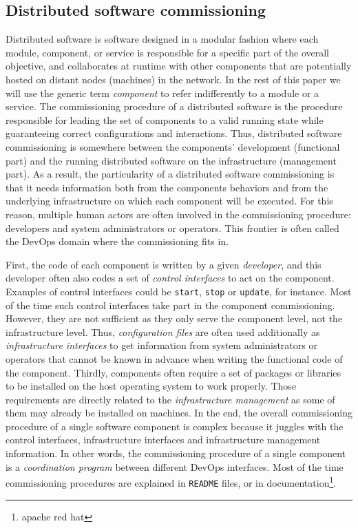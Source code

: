 
\subsection{Distributed software commissioning}

Distributed software is software designed in a modular fashion
where each module, component, or service is responsible for a
specific part of the overall objective, and collaborates at runtime
with other components that are potentially hosted on distant nodes
(\ie machines) in the network. In the rest of this paper we will
use the generic term \emph{component} to refer
indifferently to a module or a service.
%
The commissioning procedure of a distributed software is the procedure
responsible for leading the set of components to a valid running state
while guaranteeing correct configurations and
interactions. Thus, distributed software commissioning is somewhere
between the components' development (functional part) and the running
distributed software on the infrastructure (management part). As a
result, the particularity of a distributed software commissioning is
that it needs information both from the components behaviors and from the
underlying infrastructure on which each component will be executed.
For this reason, multiple human actors are often involved in the
commissioning procedure: developers and system administrators or
operators. This frontier is often called the DevOps domain where the
commissioning fits in.

First, the code of each component is written by a given
\emph{developer}, and this developer often also codes a set of
\emph{control interfaces} to act on the component. Examples of control
interfaces could be \texttt{start}, \texttt{stop} or \texttt{update},
for instance. Most of the time such control interfaces take part in
the component commissioning. However, they are not sufficient as they
only serve the component level, not the infrastructure level. Thus,
\emph{configuration files} are often used additionally as
\emph{infrastructure interfaces} to get information from system
administrators or operators that cannot be known in advance when
writing the functional code of the component. Thirdly, components often
require a set of packages or libraries to be installed on the host
operating system to work properly. Those requirements are directly
related to the \emph{infrastructure management} as some of them may
already be installed on machines. In the end, the overall
commissioning procedure of a single software component is complex because
it juggles with the control interfaces, infrastructure interfaces and
infrastructure management information. In other words, the
commissioning procedure of a single component is a \emph{coordination
  program} between different DevOps interfaces. Most of the time
commissioning procedures are explained in \texttt{README} files, or in
documentation\footnote{apache red hat}.

